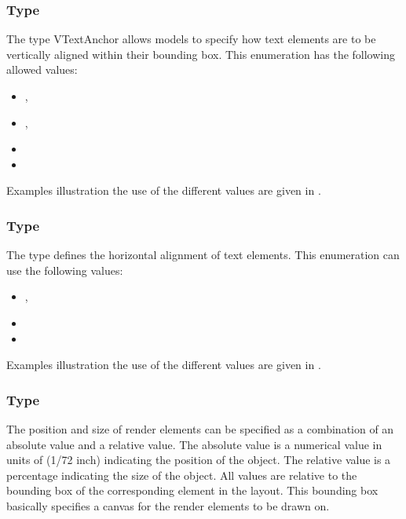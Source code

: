 \subsubsection{Type \fixttspace{}}

The type VTextAnchor allows models to specify how text elements are to be
vertically aligned within their bounding box. This enumeration has the following allowed values: 

\begin{itemize}
 \item {},
 \item {},
 \item {} 
 \item {}
\end{itemize}

Examples illustration the use of the different \VTextAnchor values are given in .




\subsubsection{Type \fixttspace{}}

The type \HTextAnchor defines the horizontal alignment of text elements. This enumeration can use the following values: 

\begin{itemize}
 \item {},
 \item {}
 \item {}
\end{itemize}

Examples illustration the use of the different \HTextAnchor values are given in .



\subsubsection{Type \fixttspace{}}

The position and size of render elements can be specified as a combination of an absolute value and a relative value. The absolute value is a numerical value in units of  (1/72 inch) indicating the position of the object. The relative value is a percentage indicating the size of the object. All values are relative to the bounding box of the corresponding element in the layout. This bounding box basically specifies a canvas for the render elements to be drawn on.

